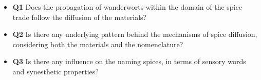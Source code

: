 \begin{itemize}
    \item \textbf{Q1} Does the propagation of \glspl{wanderwort} within the domain of the spice trade follow the diffusion of the materials?

    \item \textbf{Q2} Is there any underlying pattern behind the mechanisms of spice diffusion, considering both the materials and the nomenclature?
    
    \item \textbf{Q3} Is there any influence on the naming spices, in terms of sensory words and synesthetic properties?
    
    

\end{itemize}





